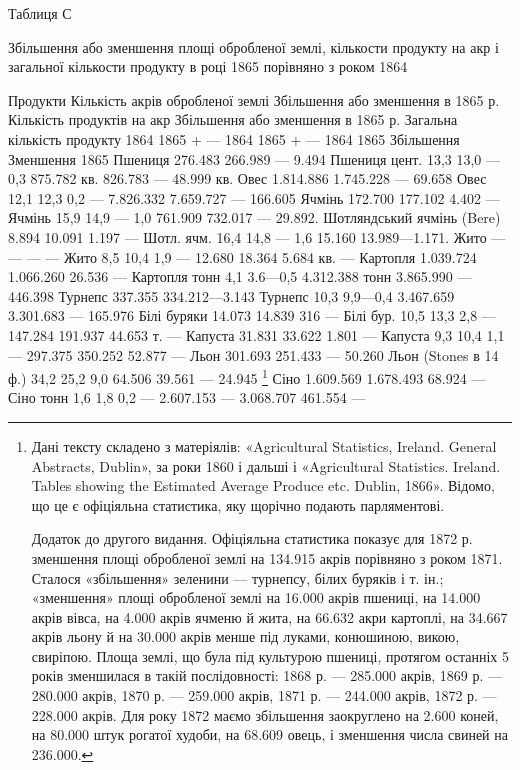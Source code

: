 Таблиця С

Збільшення або зменшення площі обробленої землі, кількости продукту на акр і загальної кількости
продукту в році 1865 порівняно з роком 1864

Продукти    Кількість акрів обробленої землі        Збільшення або зменшення в 1865 р. Кількість
продуктів на акр            Збільшення або зменшення в 1865 р. Загальна кількість продукту
    1864    1865 + — 1864        1865 + — 1864        1865    Збільшення    Зменшення 1865
Пшениця             276.483           266.989  — 9.494
Пшениця цент.    13,3    13,0 — 0,3    875.782    кв.    826.783    —   48.999 кв.
Овес                              1.814.886       1.745.228   —   69.658
Овес    12,1    12,3    0,2  —   7.826.332   7.659.727   —   166.605
Ячмінь                           172.700           177.102             4.402 —
Ячмінь     15,9    14,9    —   1,0    761.909        732.017  —  29.892.
Шотляндський ячмінь (Bere)    8.894    10.091    1.197   —
Шотл. ячм. 16,4    14,8  —  1,6    15.160        13.989—1.171.
Жито    —    —    —     —
Жито 8,5    10,4    1,9   —   12.680 18.364    5.684 кв. —
Картопля       1.039.724      1.066.260            26.536 —
Картопля тонн    4,1    3.6—0,5    4.312.388   тонн    3.865.990    —    446.398
Турнепс                      337.355    334.212—3.143
Турнепс 10,3    9,9—0,4    3.467.659        3.301.683     —     165.976
Білі буряки 14.073    14.839    316        —
Білі бур. 10,5    13,3    2,8     —     147.284     191.937    44.653 т.     —
Капуста        31.831    33.622    1.801 —
Капуста    9,3    10,4    1,1    —     297.375        350.252    52.877 —
Льон        301.693    251.433       —      50.260
Льон (Stones в 14 ф.) 34,2        25,2            9,0    64.506        39.561    —  24.945 \footnote{
Дані тексту складено з матеріялів: «Agricultural Statistics, Ireland. General Abstracts,
Dublin», за роки 1860 і дальші і «Agricultural Statistics. Ireland. Tables showing the Estimated
Average Produce etc. Dublin, 1866».
Відомо, що це є офіціяльна статистика, яку щорічно подають парляментові.

Додаток до другого видання. Офіціяльна статистика показує для 1872 р. зменшення площі обробленої
землі на 134.915 акрів порівняно з роком 1871. Сталося «збільшення» зеленини — турнепсу, білих
буряків і т. ін.; «зменшення» площі обробленої землі на 16.000 акрів пшениці, на 14.000 акрів вівса,
на 4.000 акрів ячменю й жита, на 66.632 акри картоплі, на 34.667 акрів льону й на 30.000 акрів менше
під луками, конюшиною, викою, свиріпою. Площа землі, що була під культурою пшениці, протягом
останніх 5 років зменшилася в такій послідовності: 1868 р. — 285.000 акрів, 1869 р. — 280.000 акрів,
1870 р. — 259.000 акрів, 1871 р. — 244.000 акрів, 1872 р. — 228.000 акрів. Для року 1872 маємо
збільшення заокруглено на 2.600 коней, на 80.000 штук рогатої худоби, на 68.609 овець, і зменшення
числа свиней на 236.000.
}
Сіно        1.609.569    1.678.493    68.924      —
Сіно тонн    1,6    1,8    0,2   —  2.607.153   —  3.068.707    461.554   —
